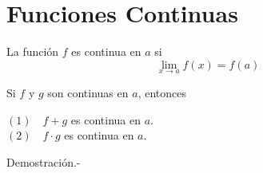 \chapter{Funciones Continuas}

\begin{tcolorbox}[colframe = white]
    \begin{def.} La función $f$ es continua  en $a$ si $$\lim\limits_{x\to a} f(x) = f(a)$$
    \end{def.}
\end{tcolorbox}

\begin{teo} Si $f$ y $g$ son continuas en $a$, entonces 
    \begin{center}
    $(1)\quad f+g$ es continua en $a$.\\
    $(2) \quad f\cdot g$ es continua en $a$.
    \end{center}	
    Demostración.-\; 
\end{teo}

